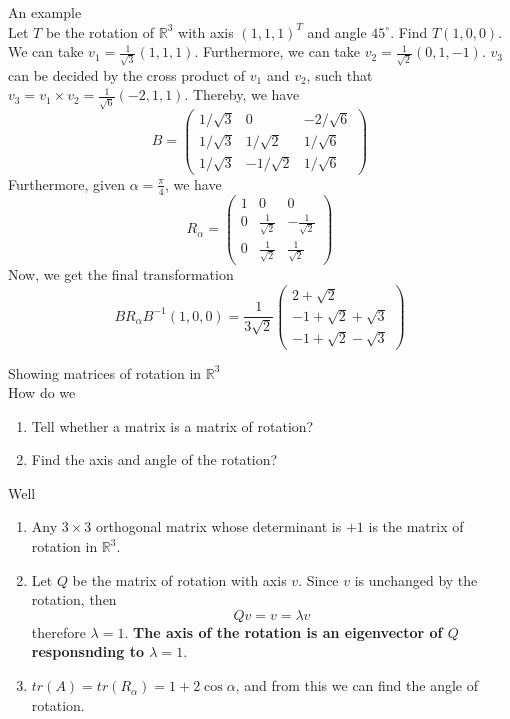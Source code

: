 \documentclass[journal, letterpaper]{IEEEtran}
\begin{document}
    \begin{myboxg}{An example} \\
        Let $T$ be the rotation of $\mathbb{R}^3$ with axis $(1, 1, 1)^T$ and angle $45^{\circ}$. Find $T(1, 0, 0)$.
        \newline \\
        We can take $v_1 = \frac{1}{\sqrt{3}}(1, 1, 1)$.  Furthermore, we can take $v_2 = \frac{1}{\sqrt{2}}(0, 1, -1)$.
        $v_3$ can be decided by the cross product of $v_1$ and $v_2$, such that $v_3 = v_1 \times v_2 = \frac{1}{\sqrt{6}}(-2, 1, 1)$. Thereby, we have
        $$ B = \begin{pmatrix}
            1/\sqrt{3} & 0 & -2/\sqrt{6} \\ 
            1/\sqrt{3} & 1/\sqrt{2} & 1/\sqrt{6} \\
            1/\sqrt{3} & -1/\sqrt{2} & 1/\sqrt{6}
        \end{pmatrix}$$
        Furthermore, given $\alpha = \frac{\pi}{4}$, we have
        $$ R_\alpha = \begin{pmatrix}
            1 & 0 & 0 \\ 0 & \frac{1}{\sqrt{2}} & -\frac{1}{\sqrt{2}} \\ 
            0 & \frac{1}{\sqrt{2}} & \frac{1}{\sqrt{2}}
        \end{pmatrix}$$
        Now, we get the final transformation
        $$ BR_\alpha B^{-1}(1, 0, 0) = \frac{1}{3\sqrt{2}} \begin{pmatrix}
            2 + \sqrt{2} \\ -1 + \sqrt{2} + \sqrt{3} \\ -1 + \sqrt{2} - \sqrt{3} 
        \end{pmatrix}$$
    \end{myboxg}
    \begin{myboxr}{Showing matrices of rotation in $\mathbb{R}^3$} \\ 
        How do we
        \begin{enumerate}
            \item Tell whether a matrix is a matrix of rotation?
            \item Find the axis and angle of the rotation?
        \end{enumerate} 
        Well
        \begin{enumerate}
            \item Any $3 \times 3$ orthogonal matrix whose determinant is $+1$ is the matrix of rotation in $\mathbb{R}^3$.
            \item Let $Q$ be the matrix of rotation with axis $v$. Since $v$ is unchanged by the rotation, then
            $$ Qv = v = \lambda v$$
            therefore $\lambda = 1$. \textbf{The axis of the rotation is an eigenvector of $Q$ responsnding to $\lambda = 1$}.
            \item $tr(A) = tr(R_{\alpha}) = 1 + 2\cos\alpha$, and from this we can find the angle of rotation.
        \end{enumerate}
    \end{myboxr}
\end{document}
